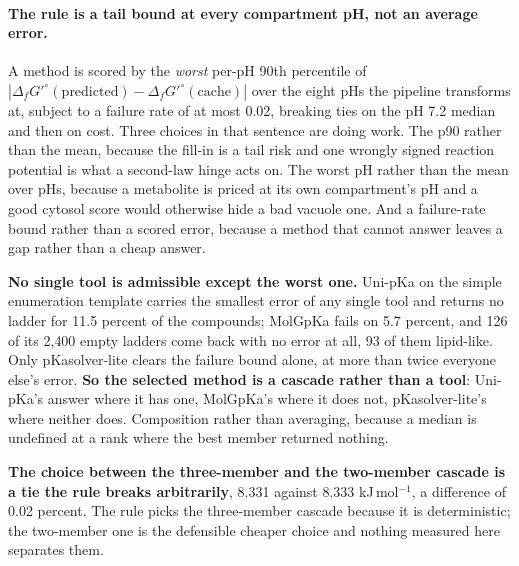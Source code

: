 \paragraph{The rule is a tail bound at every compartment pH, not an average error.} A method
is scored by the \emph{worst} per-pH 90th percentile of
$|\Delta_f G'^{\circ}(\textrm{predicted}) - \Delta_f G'^{\circ}(\textrm{cache})|$ over the
eight pHs the pipeline transforms at, subject to a failure rate of at most 0.02, breaking
ties on the pH 7.2 median and then on cost. Three choices in that sentence are doing work.
The p90 rather than the mean, because the fill-in is a tail risk and one wrongly signed
reaction potential is what a second-law hinge acts on. The worst pH rather than the mean
over pHs, because a metabolite is priced at its own compartment's pH and a good cytosol
score would otherwise hide a bad vacuole one. And a failure-rate bound rather than a scored
error, because a method that cannot answer leaves a gap rather than a cheap answer.





\textbf{No single tool is admissible except the worst one.} Uni-pKa on the simple
enumeration template carries the smallest error of any single tool and returns no ladder for
11.5 percent of the compounds; MolGpKa fails on 5.7 percent, and 126 of its 2{,}400 empty
ladders come back with no error at all, 93 of them lipid-like. Only pKasolver-lite clears
the failure bound alone, at more than twice everyone else's error. \textbf{So the selected
method is a cascade rather than a tool}: Uni-pKa's answer where it has one, MolGpKa's where
it does not, pKasolver-lite's where neither does. Composition rather than averaging, because
a median is undefined at a rank where the best member returned nothing.

\textbf{The choice between the three-member and the two-member cascade is a tie the rule
breaks arbitrarily}, 8.331 against 8.333 kJ\,mol$^{-1}$, a difference of 0.02 percent. The
rule picks the three-member cascade because it is deterministic; the two-member one is the
defensible cheaper choice and nothing measured here separates them.

